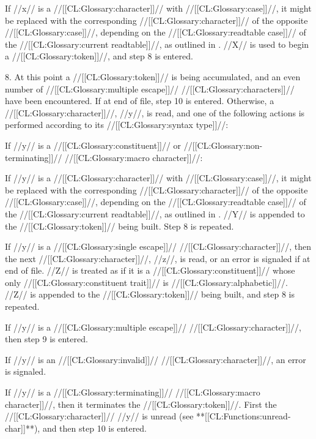 If //x// is a //[[CL:Glossary:character]]// with //[[CL:Glossary:case]]//,
it might be replaced with the corresponding //[[CL:Glossary:character]]// of the opposite //[[CL:Glossary:case]]//, 
depending on the //[[CL:Glossary:readtable case]]// of the //[[CL:Glossary:current readtable]]//,
as outlined in \secref\ReadtableCaseReadEffect.
//X// is used to begin a //[[CL:Glossary:token]]//, and step 8 is entered.




\item{8.}
At this point a //[[CL:Glossary:token]]// is being accumulated, and an even number
of //[[CL:Glossary:multiple escape]]// //[[CL:Glossary:characters]]// have been encountered.
If at end of file, step 10 is entered.
Otherwise, a //[[CL:Glossary:character]]//, //y//, is read, and
one of the following actions is performed according to its //[[CL:Glossary:syntax type]]//:

\beginlist
\itemitem{\bull}
If //y// is a //[[CL:Glossary:constituent]]// or //[[CL:Glossary:non-terminating]]// //[[CL:Glossary:macro character]]//:
\beginlist
\itemitem{--}



If //y// is a //[[CL:Glossary:character]]// with //[[CL:Glossary:case]]//,
it might be replaced with the corresponding //[[CL:Glossary:character]]// of the opposite //[[CL:Glossary:case]]//, 
depending on the //[[CL:Glossary:readtable case]]// of the //[[CL:Glossary:current readtable]]//,
as outlined in \secref\ReadtableCaseReadEffect.
\itemitem{--}
//Y// is appended to the //[[CL:Glossary:token]]// being built.
\itemitem{--}
Step 8 is repeated.
\endlist


\itemitem{\bull}
If //y// is a //[[CL:Glossary:single escape]]// //[[CL:Glossary:character]]//, then the next //[[CL:Glossary:character]]//,
//z//, is read, or an error  is signaled if at end of file.
//Z// is treated as if it is a //[[CL:Glossary:constituent]]// 
whose only //[[CL:Glossary:constituent trait]]// is //[[CL:Glossary:alphabetic]]//.
//Z// is appended to the //[[CL:Glossary:token]]// being built,
and step 8 is repeated.


\itemitem{\bull}
If //y// is a //[[CL:Glossary:multiple escape]]// //[[CL:Glossary:character]]//,
then step 9 is entered.


\itemitem{\bull}
If //y// is an //[[CL:Glossary:invalid]]// //[[CL:Glossary:character]]//,
an error  is signaled.


\itemitem{\bull}
If //y// is a //[[CL:Glossary:terminating]]// //[[CL:Glossary:macro character]]//,
then it terminates the //[[CL:Glossary:token]]//.
First the //[[CL:Glossary:character]]// //y// is unread (see **[[CL:Functions:unread-char]]**),
and then step 10 is entered.


